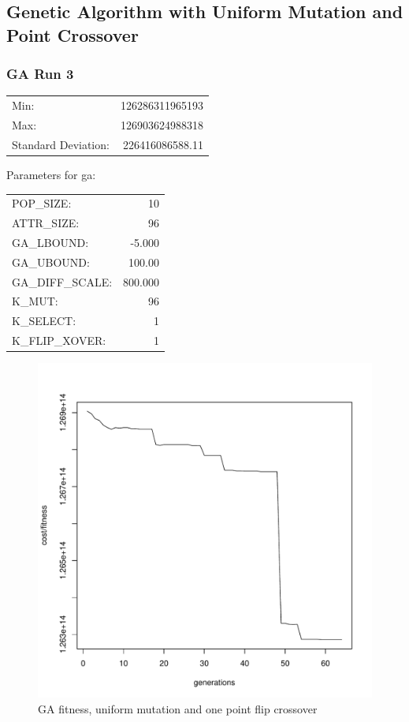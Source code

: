 \pagebreak
\subsection{Genetic Algorithm with Uniform Mutation and Point Crossover}
\subsubsection{GA Run 3}
\begin{tabular}{lr}
	Min: 			& 126286311965193 \\
	Max:			& 126903624988318 \\
	Standard Deviation:	& 226416086588.11 \\
\end{tabular}

Parameters for ga:\\
\begin{tabular}{lr}
	POP\_SIZE:	& 10 \\
	ATTR\_SIZE:	& 96 \\
	GA\_LBOUND:	& -5.000 \\
	GA\_UBOUND:	& 100.00 \\
	GA\_DIFF\_SCALE: & 800.000 \\
	K\_MUT:		& 96 \\
	K\_SELECT:	& 1 \\
	K\_FLIP\_XOVER:	& 1 \\
\end{tabular}

\begin{figure}[!h]
	\begin{center}
		\includegraphics[width=120mm]{output/ga03/graph.pdf}
               	\caption{GA fitness, uniform mutation and one point flip crossover}
                \label{saXX_exc}
        \end{center}
\end{figure}


